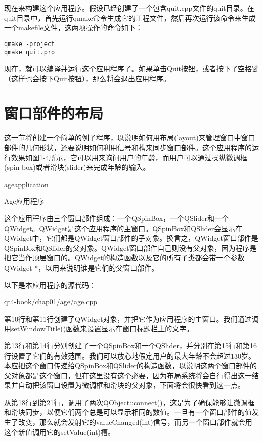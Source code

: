 \documentclass[11pt,oneside]{book}
\begin{document}
\begin{common-format}
现在来构建这个应用程序。假设已经创建了一个包含quit.cpp文件的quit目录。在quit目录中，首先运行qmake命令生成它的工程文件，然后再次运行该命令来生成一个makefile文件，这两项操作的命令如下：
\begin{Verbatim}
qmake -project
qmake quit.pro
\end{Verbatim}

现在，就可以编译并运行这个应用程序了。如果单击Quit按钮，或者按下了空格键（这样也会按下Quit按钮），那么将会退出应用程序。


\section{窗口部件的布局}
这一节将创建一个简单的例子程序，以说明如何用布局(layout)来管理窗口中窗口部件的几何形状，还要说明如何利用信号和槽来同步窗口部件。这个应用程序的运行效果如图1-4所示，它可以用来询问用户的年龄，而用户可以通过操纵微调框(spin box)或者滑块(slider)来完成年龄的输入。
\begin{fig}{ageapplication}
\caption{Age应用程序}
\label{fig:ageapplication}
\end{fig}

这个应用程序由三个窗口部件组成：一个QSpinBox，一个QSlider和一个QWidget。QWidget是这个应用程序的主窗口。QSpinBox和QSlider会显示在QWidget中，它们都是QWidget窗口部件的子对象。换言之，QWidget窗口部件是QSpinBox和QSlider的父对象。QWidget窗口部件自己则没有父对象，因为程序是把它当作顶层窗口的。QWidget的构造函数以及它的所有子类都会带一个参数QWidget *，以用来说明谁是它们的父窗口部件。

以下是本应用程序的源代码：
\begin{cppinput}{qt4-book/chap01/age/age.cpp}
\end{cppinput}

第10行和第11行创建了QWidget对象，并把它作为应用程序的主窗口。我们通过调用setWindowTitle()函数来设置显示在窗口标题栏上的文字。

第13行和第14行分别创建了一个QSpinBox和一个QSlider，并分别在第15行和第16行设置了它们的有效范围。我们可以放心地假定用户的最大年龄不会超过130岁。本应把这个窗口传递给QSpinBox和QSlider的构造函数，以说明这两个窗口部件的父对象都是这个窗口，但在这里没有这个必要，因为布局系统将会自行得出这一结果并自动把该窗口设置为微调框和滑块的父对象，下面将会很快看到这一点。

从第18行到第21行，调用了两次QObject::connect()，这是为了确保能够让微调框和滑块同步，以便它们两个总是可以显示相同的数值。一旦有一个窗口部件的值发生了改变，那么就会发射它的valueChanged(int)信号，而另一个窗口部件就会用这个新值调用它的setValue(int)槽。


\end{common-format}
\end{document}
